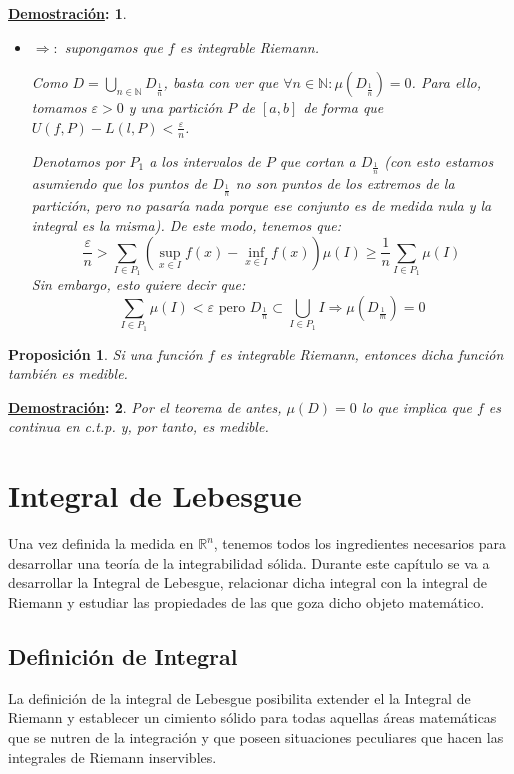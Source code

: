 \documentclass[10pt,a4paper,openright]{book}
\theoremstyle{break}
\newtheorem*{prop}{Proposición}
\newtheorem*{demo}{\underline{Demostración}:}
\begin{document}
\begin{demo}
\begin{itemize}
\item $\Rightarrow:$ supongamos que $f$ es integrable Riemann.

Como $D = \bigcup_{n \in \mathbb{N}} D_{\frac{1}{n}}$, basta con ver que $\forall n \in \mathbb{N}: \mu\left(D_{\frac{1}{n}}\right) = 0$. Para ello, tomamos $\varepsilon > 0$ y una partición $P$ de $\left[a, b\right]$ de forma que $U\left(f, P\right) - L\left(l, P\right) < \frac{\varepsilon}{n}$.

Denotamos por $P_1$ a los intervalos de $P$ que cortan a $D_{\frac{1}{n}}$ (con esto estamos asumiendo que los puntos de $D_{\frac{1}{n}}$ no son puntos de los extremos de la partición, pero no pasaría nada porque ese conjunto es de medida nula y la integral es la misma). De este modo, tenemos que:
$$\frac{\varepsilon}{n} > \sum_{I \in P_1} \left(\sup_{x \in I} f\left(x\right) - \inf_{x \in I} f\left(x\right) \right) \mu\left(I\right) \ge \frac{1}{n} \sum_{I \in P_1} \mu\left(I\right)$$
Sin embargo, esto quiere decir que:
$$\sum_{I \in P_1} \mu\left(I\right) < \varepsilon \mbox{ pero } D_{\frac{1}{n}} \subset \bigcup_{I \in P_1} I \Rightarrow \mu\left(D_{\frac{1}{m}}\right) = 0$$
\end{itemize}
\end{demo}

\begin{prop}
Si una función $f$ es integrable Riemann, entonces dicha función también es medible.
\end{prop}
\begin{demo}
Por el teorema de antes, $\mu(D) = 0$ lo que implica que $f$ es continua en c.t.p. y, por tanto, es medible.
\end{demo}

\chapter{Integral de Lebesgue}
Una vez definida la medida en $\mathbb{R}^n$, tenemos todos los ingredientes necesarios para desarrollar una teoría de la integrabilidad sólida. Durante este capítulo se va a desarrollar la Integral de Lebesgue, relacionar dicha integral con la integral de Riemann y estudiar las propiedades de las que goza dicho objeto matemático.

\section{Definición de Integral}
La definición de la integral de Lebesgue posibilita extender el la Integral de Riemann y establecer un cimiento sólido para todas aquellas áreas matemáticas que se nutren de la integración y que poseen situaciones peculiares que hacen las integrales de Riemann inservibles.
\end{document}
